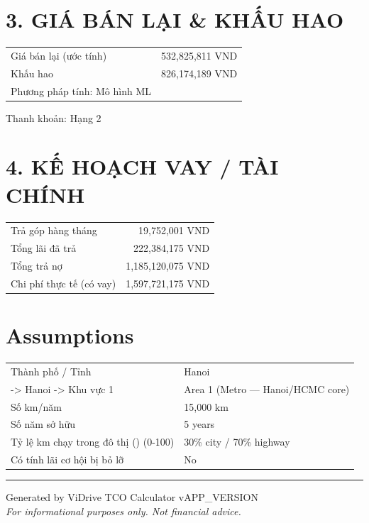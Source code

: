 \documentclass[11pt,a4paper]{article}
\begin{document}
\section*{3. GIÁ BÁN LẠI \& KHẤU HAO}
\begin{tabular}{l r}
\toprule
Giá bán lại (ước tính) & 532,825,811 VND \\
Khấu hao & 826,174,189 VND \\
Phương pháp tính: Mô hình ML &  \\
\bottomrule
\end{tabular}
\vspace{0.3cm}Thanh khoản: Hạng 2

\section*{4. KẾ HOẠCH VAY / TÀI CHÍNH}
\begin{tabular}{l r}
\toprule
Trả góp hàng tháng & 19,752,001 VND \\
Tổng lãi đã trả & 222,384,175 VND \\
Tổng trả nợ & 1,185,120,075 VND \\
Chi phí thực tế (có vay) & 1,597,721,175 VND \\
\bottomrule
\end{tabular}
\vspace{0.3cm}\section*{Assumptions}
\begin{center}
\begin{tabular}{l l}
\toprule
Thành phố / Tỉnh & Hanoi \\
  -> Hanoi -> Khu vực 1 & Area 1 (Metro — Hanoi/HCMC core) \\
Số km/năm & 15,000 km \\
Số năm sở hữu & 5 years \\
  Tỷ lệ km chạy trong đô thị () (0-100) & 30\% city / 70\% highway \\
  Có tính lãi cơ hội bị bỏ lỡ & No \\
\bottomrule
\end{tabular}
\end{center}
\vspace{0.5cm}
\vspace{1cm}
\hrule
\vspace{0.3cm}
\begin{center}
    {\small Generated by ViDrive TCO Calculator v{APP_VERSION}}\\
    {\small \textit{For informational purposes only. Not financial advice.}}
\end{center}
\end{document}
